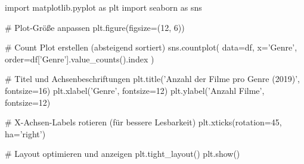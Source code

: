 import matplotlib.pyplot as plt
import seaborn as sns

# Plot-Größe anpassen
plt.figure(figsize=(12, 6))

# Count Plot erstellen (absteigend sortiert)
sns.countplot(
    data=df, 
    x='Genre', 
    order=df['Genre'].value_counts().index
)

# Titel und Achsenbeschriftungen
plt.title('Anzahl der Filme pro Genre (2019)', fontsize=16)
plt.xlabel('Genre', fontsize=12)
plt.ylabel('Anzahl Filme', fontsize=12)

# X-Achsen-Labels rotieren (für bessere Lesbarkeit)
plt.xticks(rotation=45, ha='right')

# Layout optimieren und anzeigen
plt.tight_layout()
plt.show()